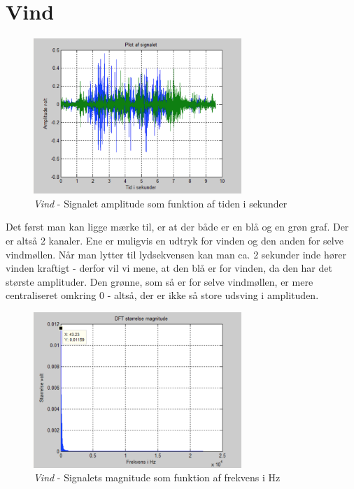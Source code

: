 \section{Vind}

\begin{figure}[H]
	\centering
	\includegraphics[width=0.7\textwidth]{Figurer/Vind}
	\caption{\textit{Vind} - Signalet amplitude som funktion af tiden i sekunder}
\end{figure}

Det først man kan ligge mærke til, er at der både er en blå og en grøn graf. Der er altså 2 kanaler. Ene er muligvis en udtryk for vinden og den anden for selve vindmøllen. Når man lytter til lydsekvensen kan man ca. 2 sekunder inde hører vinden kraftigt - derfor vil vi mene, at den blå er for vinden, da den har det største amplituder. Den grønne, som så er for selve vindmøllen, er mere centraliseret omkring 0 - altså, der er ikke så store udsving i amplituden.  

\begin{figure}[H]
	\centering
	\includegraphics[width=0.7\textwidth]{Figurer/Vind2}
	\caption{\textit{Vind} - Signalets magnitude som funktion af frekvens i Hz}
\end{figure}


